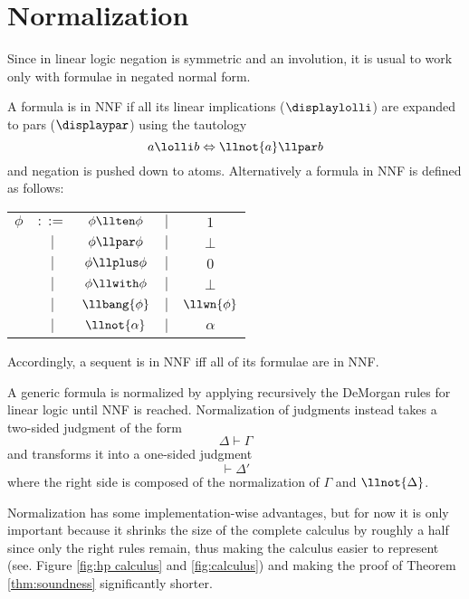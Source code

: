 \section{Normalization}\label{sec:normalization}
Since in linear logic negation is symmetric and an involution, it is usual to work only with formulae in negated normal form.
\begin{define}
	\label{def:nnf}
	A formula is in NNF if all its linear implications ($\displaylolli$) are expanded to pars ($\displaypar$) using the tautology
	$$ a \lolli b \Leftrightarrow \llnot{a} \llpar b $$
	and negation is pushed down to atoms.
	Alternatively a formula in NNF is defined as follows:
	\begin{center}
		\begin{tabular}{ccccc}
			$\phi$ & $ ::=  $  & $ \phi \llten \phi  $ & $ \mid $ & $ 1    $ \\
			       & $ \mid $  & $ \phi \llpar \phi  $ & $ \mid $ & $ \bot $ \\
			       & $ \mid $  & $ \phi \llplus \phi $ & $ \mid $ & $ 0    $ \\
			       & $ \mid $  & $ \phi \llwith \phi $ & $ \mid $ & $ \bot $ \\
			       & $ \mid $  & $ \llbang{\phi}     $ & $ \mid $ & $ \llwn{\phi} $ \\
			       & $ \mid $  & $ \llnot{\alpha}    $ & $ \mid $ & $ \alpha $
		\end{tabular}
	\end{center}
	Accordingly, a sequent is in NNF iff all of its formulae are in NNF.
\end{define}
A generic formula is normalized by applying recursively the DeMorgan rules for linear logic until NNF is reached.
Normalization of judgments instead takes a two-sided judgment of the form
$$ \Delta \vdash \Gamma $$
and transforms it into a one-sided judgment
$$ \vdash \Delta' $$
where the right side is composed of the normalization of $\Gamma$ and $\llnot{\Delta}$.

Normalization has some implementation-wise advantages, but for now it is only important because it shrinks the size of the complete calculus by roughly a half since only the right rules remain, thus making the calculus easier to represent (see. Figure \ref{fig:hp calculus} and \ref{fig:calculus}) and making the proof of Theorem \ref{thm:soundness} significantly shorter.

